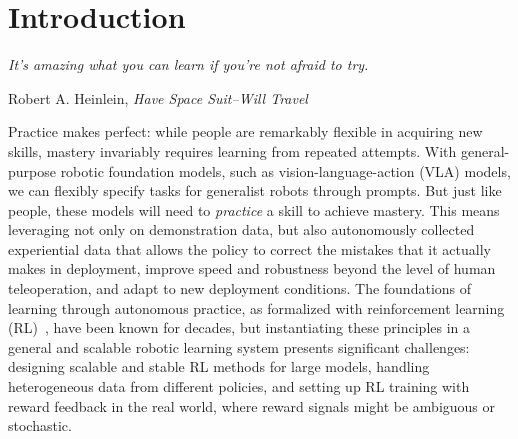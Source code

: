 \documentclass[conference]{IEEEtran}
\def \ModelSymbol {$\pi^{*}_{0.6}$}
\def \MethodFullName {RL with Experience and Corrections via Advantage-conditioned Policies}
\def \MethodName {\textsc{Recap}}
\begin{document}
\maketitle

\begin{abstract}
We study how vision-language-action (VLA) models can improve through real-world deployments via reinforcement learning (RL). We present a general-purpose method, \MethodFullName{} (\MethodName{}), that provides for RL training of VLAs via advantage conditioning. Our method incorporates heterogeneous data into the self-improvement process, including demonstrations, data from on-policy collection, and expert teleoperated interventions provided during autonomous execution. \MethodName{} starts by pre-training a generalist VLA with offline RL, which we call \ModelSymbol{}, that can then be specialized to attain high performance on downstream tasks through on-robot data collection. We show that the \ModelSymbol{} model trained with the full \MethodName{} method can fold laundry in real homes, reliably assemble boxes, and make espresso drinks using a professional espresso machine. On some of the hardest tasks, \MethodName{} more than doubles task throughput and roughly halves the task failure rate.
\end{abstract}

\IEEEpeerreviewmaketitle

\section{Introduction}

\setcounter{figure}{1}

\setlength{\epigraphwidth}{0.42\textwidth}
\epigraph{\textit{It’s amazing what you can learn if you’re not afraid to try.}}{Robert A. Heinlein, \textit{Have Space Suit--Will Travel}}

Practice makes perfect: while people are remarkably flexible in acquiring new skills, mastery invariably requires learning from repeated attempts. With general-purpose robotic foundation models, such as vision-language-action (VLA) models, we can flexibly specify tasks for generalist robots through prompts. But just like people, these models will need to \emph{practice} a skill to achieve mastery. This means leveraging not only on demonstration data, but also autonomously collected experiential data that allows the policy to correct the mistakes that it actually makes in deployment, improve speed and robustness beyond the level of human teleoperation, and adapt to new deployment conditions. The foundations of learning through autonomous practice, as formalized with reinforcement learning (RL)~\citep{sutton2018reinforcement}, have been known for decades, but instantiating these principles in a general and scalable robotic learning system presents significant challenges: designing scalable and stable RL methods for large models, handling heterogeneous data from different policies, and setting up RL training with reward feedback in the real world, where reward signals might be ambiguous or stochastic.
\end{document}

